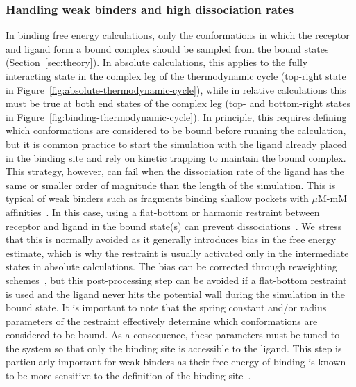 \documentclass[9pt,bestpractices]{livecoms}
\begin{document}
\subsubsection{Handling weak binders and high dissociation rates}
In binding free energy calculations, only the conformations in which the receptor and ligand form a bound complex should be sampled from the bound states (Section~\ref{sec:theory}).
In absolute calculations, this applies to the fully interacting state in the complex leg of the thermodynamic cycle (top-right state in Figure~\ref{fig:absolute-thermodynamic-cycle}), while in relative calculations this must be true at both end states of the complex leg (top- and bottom-right states in Figure~\ref{fig:binding-thermodynamic-cycle}).
In principle, this requires defining which conformations are considered to be bound before running the calculation, but it is common practice to start the simulation with the ligand already placed in the binding site and rely on kinetic trapping to maintain the bound complex.
This strategy, however, can fail when the dissociation rate of the ligand has the same or smaller order of magnitude than the length of the simulation.
This is typical of weak binders such as fragments binding shallow pockets with $\mu$M-mM affinities~\cite{georgiou_pushing_2017,pan2017quantitative}.
In this case, using a flat-bottom or harmonic restraint between receptor and ligand in the bound state(s) can prevent dissociations~\cite{georgiou_pushing_2017,rizzi2019sampl6}.
We stress that this is normally avoided as it generally introduces bias in the free energy estimate, which is why the restraint is usually activated only in the intermediate states in absolute calculations.
The bias can be corrected through reweighting schemes~\cite{rizzi2019sampl6}, but this post-processing step can be avoided if a flat-bottom restraint is used and the ligand never hits the potential wall during the simulation in the bound state.
It is important to note that the spring constant and/or radius parameters of the restraint effectively determine which conformations are considered to be bound.
As a consequence, these parameters must be tuned to the system so that only the binding site is accessible to the ligand.
This step is particularly important for weak binders as their free energy of binding is known to be more sensitive to the definition of the binding site~\cite{gilson1997statisticalthermodynamic}.
\end{document}
